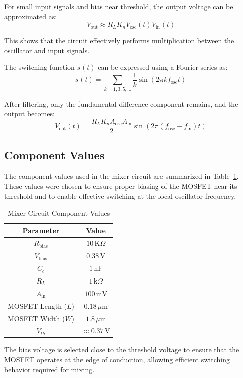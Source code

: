 \documentclass[conference]{IEEEtran}
\begin{document}
For small input signals and bias near threshold, the output voltage can be approximated as:
\begin{equation}
V_{\text{out}} \approx R_L K_n V_{\text{osc}}(t) V_{\text{in}}(t)
\end{equation}

This shows that the circuit effectively performs multiplication between the oscillator and input signals.

\bigskip

The switching function $s(t)$ can be expressed using a Fourier series as:
\begin{equation}
s(t) = \sum_{k=1,3,5,\dots} \frac{1}{k} \sin(2\pi k f_{\text{osc}} t)
\end{equation}

After filtering, only the fundamental difference component remains, and the output becomes:
\begin{equation}
V_{\text{out}}(t) = \frac{R_L K_n A_{\text{osc}} A_{\text{in}}}{2} \sin\left(2\pi (f_{\text{osc}} - f_{\text{in}}) t\right)
\end{equation}

\subsection{Component Values}

The component values used in the mixer circuit are summarized in Table~\ref{tab:mixer_values}. These values were chosen to ensure proper biasing of the MOSFET near its threshold and to enable effective switching at the local oscillator frequency.

\begin{table}[h]
\centering
\caption{Mixer Circuit Component Values}
\label{tab:mixer_values}
\begin{tabular}{|c|c|}
\hline
\textbf{Parameter} & \textbf{Value} \\
\hline
$R_{\text{bias}}$ & $10\,\text{K}\Omega$ \\
$V_{\text{bias}}$ & $0.38\,\text{V}$ \\
$C_c$ & $1\,\text{nF}$ \\
$R_L$ & $1\,\text{k}\Omega$ \\
$A_{\text{in}}$ & $100\,\text{mV}$ \\
MOSFET Length ($L$) & $0.18\,\mu\text{m}$ \\
MOSFET Width ($W$) & $1.8\,\mu\text{m}$ \\
$V_{th}$ & $\approx 0.37\,\text{V}$ \\
\hline
\end{tabular}
\end{table}
The bias voltage is selected close to the threshold voltage to ensure that the MOSFET operates at the edge of conduction, allowing efficient switching behavior required for mixing.
\end{document}
